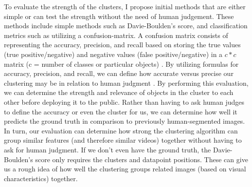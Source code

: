 \documentclass[10pt,twocolumn]{article}
\begin{document}
To evaluate the strength of the clusters, I propose initial methods that are either simple or can test the strength without the need of human judgement. These methods include simple methods such as Davie-Boulden's score, and classification metrics such as utilizing a confusion-matrix. A confusion matrix consists of representing the accuracy, precision, and recall based on storing the true values (true positive/negative) and negative values (false positive/negative) in a \(c * c\) matrix (c = number of classes or particular objects) \cite{Jordan2018}. By utilizing formulas for accuracy, precision, and recall, we can define how accurate versus precise our clustering may be in relation to human judgment \cite{Jordan2018}. By performing this evaluation, we can determine the strength and relevance of objects in the cluster to each other before deploying it to the public. Rather than having to ask human judges to define the accuracy or even the cluster for us, we can determine how well it predicts the ground truth in comparison to previously human-segmented images. In turn, our evaluation can determine how strong the clustering algorithm can group similar features (and therefore similar videos) together without having to ask for human judgment. If we don't even have the ground truth, the Davie-Boulden's score only requires the clusters and datapoint positions. These can give us a rough idea of how well the clustering groups related images (based on visual characteristics) together. 



\end{document}
